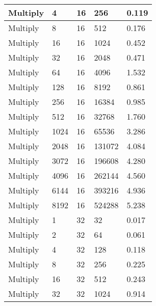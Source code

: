 \documentclass{article}
\begin{document}
\begin{longtable}{|l|l|l|l|l|}
Multiply           & 4    & 16          & 256               & 0.119             \\ \hline
Multiply           & 8    & 16          & 512               & 0.176             \\ \hline
Multiply           & 16   & 16          & 1024              & 0.452             \\ \hline
Multiply           & 32   & 16          & 2048              & 0.471             \\ \hline
Multiply           & 64   & 16          & 4096              & 1.532             \\ \hline
Multiply           & 128  & 16          & 8192              & 0.861             \\ \hline
Multiply           & 256  & 16          & 16384             & 0.985             \\ \hline
Multiply           & 512  & 16          & 32768             & 1.760             \\ \hline
Multiply           & 1024 & 16          & 65536             & 3.286             \\ \hline
Multiply           & 2048 & 16          & 131072            & 4.084             \\ \hline
Multiply           & 3072 & 16          & 196608            & 4.280             \\ \hline
Multiply           & 4096 & 16          & 262144            & 4.560             \\ \hline
Multiply           & 6144 & 16          & 393216            & 4.936             \\ \hline
Multiply           & 8192 & 16          & 524288            & 5.238             \\ \hline
Multiply           & 1    & 32          & 32                & 0.017             \\ \hline
Multiply           & 2    & 32          & 64                & 0.061             \\ \hline
Multiply           & 4    & 32          & 128               & 0.118             \\ \hline
Multiply           & 8    & 32          & 256               & 0.225             \\ \hline
Multiply           & 16   & 32          & 512               & 0.243             \\ \hline
Multiply           & 32   & 32          & 1024              & 0.914             \\ \hline

\end{longtable}
\end{document}
